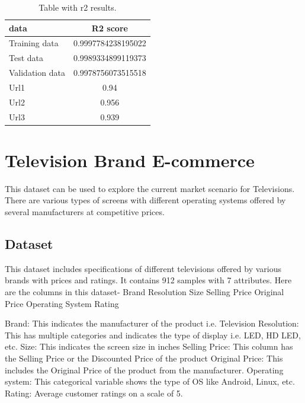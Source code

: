 \begin{table}[h!]
    \begin{center}
        \caption{Table with r2 results.}
        \label{tab:training results}
        \begin{tabular}{l|S} %
            \textbf{data} & \textbf{R2 score} \\
            \hline
            Training data & 0.9997784238195022\\
            Test data & 0.9989334899119373 \\
            Validation data & 0.9978756073515518\\
            Url1 & 0.94\\
            Url2 & 0.956\\
            Url3 & 0.939\\
        \end{tabular}
    \end{center}
\end{table}

\section{Television Brand E-commerce}
This dataset can be used to explore the current market scenario for Televisions. There are various types of screens with different operating systems offered by several manufacturers at competitive prices.

\subsection{Dataset}
This dataset includes specifications of different televisions offered by various brands with prices and ratings.
It contains 912 samples with 7 attributes. Here are the columns in this dataset-
Brand Resolution Size Selling Price Original Price Operating System Rating

Brand: This indicates the manufacturer of the product i.e. Television
Resolution: This has multiple categories and indicates the type of display i.e. LED, HD LED, etc.
Size: This indicates the screen size in inches
Selling Price: This column has the Selling Price or the Discounted Price of the product
Original Price: This includes the Original Price of the product from the manufacturer.
Operating system: This categorical variable shows the type of OS like Android, Linux, etc.
Rating: Average customer ratings on a scale of 5.


